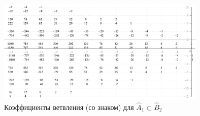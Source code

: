 \documentclass[pdftex]{beamer}
\theoremstyle{definition} \newtheorem{Def}{Определение}
\begin{document}
\begin{frame}[plain]
\begin{columns}
  \end{columns}
  \begin{figure}[b]
    \vspace*{-0.5cm}
    \centering
      \includegraphics[width=100mm]{figures/figure13}
      \vspace{-0.5cm}
    \caption{Коэффициенты ветвления (со знаком) для $\hat A_1\subset \hat B_2$}
    \label{fig:2}
  \end{figure}
\end{frame}
\end{document}

